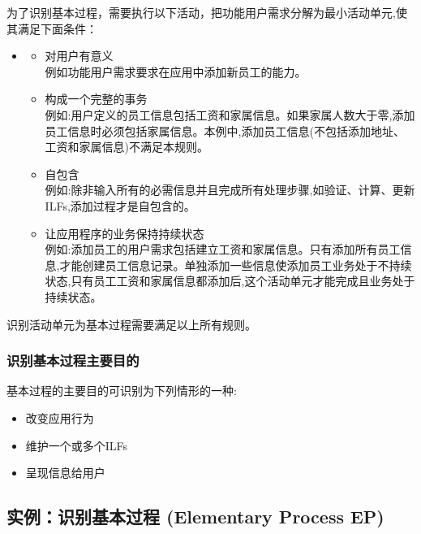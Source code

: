 为了识别基本过程，需要执行以下活动，把功能用户需求分解为最小活动单元,使其满足下面条件：

\begin{itemize}
\item
  \begin{itemize}
  \tightlist
  \item
    对用户有意义\\
    例如功能用户需求要求在应用中添加新员工的能力。\\
  \item
    构成一个完整的事务\\
    例如:用户定义的员工信息包括工资和家属信息。如果家属人数大于零,添加员工信息时必须包括家属信息。本例中,添加员工信息(不包括添加地址、工资和家属信息)不满足本规则。\\
  \item
    自包含\\
    例如:除非输入所有的必需信息并且完成所有处理步骤,如验证、计算、更新ILFs,添加过程才是自包含的。\\
  \item
    让应用程序的业务保持持续状态\\
    例如:添加员工的用户需求包括建立工资和家属信息。只有添加所有员工信息,才能创建员工信息记录。单独添加一些信息使添加员工业务处于不持续状态,只有员工工资和家属信息都添加后,这个活动单元才能完成且业务处于持续状态。\\
  \end{itemize}
\end{itemize}

识别活动单元为基本过程需要满足以上所有规则。\\

\hypertarget{ux8bc6ux522bux57faux672cux8fc7ux7a0bux4e3bux8981ux76eeux7684}{%
\subsubsection{识别基本过程主要目的}\label{ux8bc6ux522bux57faux672cux8fc7ux7a0bux4e3bux8981ux76eeux7684}}

基本过程的主要目的可识别为下列情形的一种:

\begin{itemize}
\tightlist
\item
  改变应用行为
\item
  维护一个或多个ILFs
\item
  呈现信息给用户
\end{itemize}

\hypertarget{ux5b9eux4f8bux8bc6ux522bux57faux672cux8fc7ux7a0b-ep-elementary-process}{%
\subsection{实例：识别基本过程 (Elementary
Process EP)}\label{ux5b9eux4f8bux8bc6ux522bux57faux672cux8fc7ux7a0b-ep-elementary-process}}

